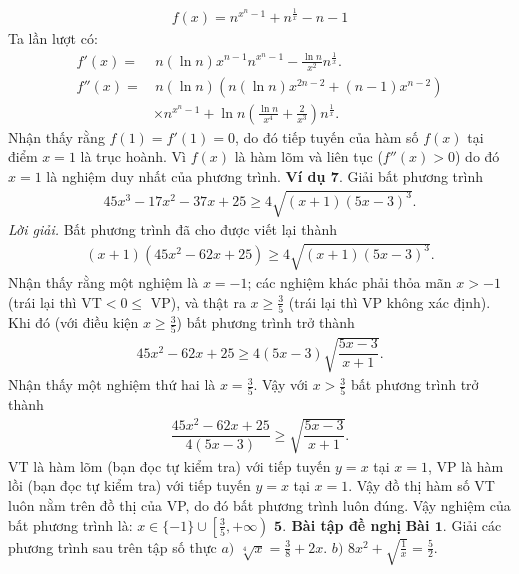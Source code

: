 \begin{multicols}{2}
	\begin{align*}
		f(x)=n^{x^n-1}+n^{\frac 1x}-n-1
	\end{align*}
	Ta lần lượt có:
	\begin{align*}
		f'(x)=&\,n(\ln n)x^{n-1}n^{x^n-1}-\frac {\ln n}{x^2}n^{\frac 1x}.\\
		f''(x)=&\,n(\ln n)\left(n(\ln n)x^{2n-2}+(n-1)x^{n-2}\right)\\
		&\times n^{x^n-1}+\ln n\left(\frac {\ln n}{x^4}+\frac 2{x^3}\right)n^{\frac 1x}.
	\end{align*}
	Nhận thấy rằng $f(1)=f'(1)=0$, do đó tiếp tuyến của hàm số $f(x)$ tại điểm $x=1$ là trục hoành.
	\vskip 0.1cm 
	Vì $f(x)$ là hàm lõm và liên tục ($f''(x)>0$) do đó $x=1$ là nghiệm duy nhất của phương trình. 
	\vskip 0.1cm
	\textbf{\color{hoccungpi}Ví dụ $\pmb{7.}$} Giải bất phương trình
	\begin{align*}
		45x^3\!-\!17x^2\!-\!37x\!+\!25\!\ge\! 4\sqrt{\!\!(x\!+\!1)(5x\!-\!3)^3}.
	\end{align*}
	\textit{Lời giải.} Bất phương trình đã cho được viết lại thành 
	\begin{align*}
		(x\!+\!1\!)(45x^2\!-\!62x\!+\!25)\!\ge\! 4\sqrt{\!\!(x\!+\!1\!)(5x\!-\!3)^3}.
	\end{align*}
	Nhận thấy rằng một nghiệm là $x=-1$; các nghiệm khác phải thỏa mãn $x>-1$ (trái lại thì VT$<0\le$ VP), và thật ra $x\ge\frac 35$ (trái lại thì VP không xác định).
	\vskip 0.1cm
	Khi đó (với điều kiện $x\ge\frac 35$) bất phương trình trở thành
	\begin{align*}
		45x^2-62x+25\ge 4(5x-3)\sqrt{\dfrac{5x-3}{x+1}}.
	\end{align*}
	Nhận thấy một nghiệm thứ hai là $x=\frac 35$. Vậy với $x>\frac 35$ bất phương trình trở thành
	\begin{align*}
		\dfrac{45x^2-62x+25}{4(5x-3)}\ge \sqrt{\dfrac{5x-3}{x+1}}.
	\end{align*}
	VT là hàm lõm (bạn đọc tự kiểm tra) với tiếp tuyến $y=x$ tại $x=1$, VP là hàm lồi (bạn đọc tự kiểm tra) với tiếp tuyến $y=x$ tại $x=1$. Vậy đồ thị hàm số VT luôn nằm trên đồ thị của VP,  do đó bất phương trình luôn đúng.
	\vskip 0.1cm
	Vậy nghiệm của bất phương trình là: \linebreak $x\in\{-1\}\cup\left[\frac 35,+\infty\right)$
	\vskip 0.1cm
	\textbf{\color{hoccungpi}$\pmb{5.}$ Bài tập đề nghị}
	\vskip 0.1cm
	\textbf{\color{hoccungpi}Bài $\pmb{1.}$} Giải các phương trình sau trên tập số thực
	\vskip 0.1cm
	$a)$  $\sqrt[4]{x}=\frac{3}{8}+2x$.
	\vskip 0.1cm
	$b)$ $8x^2+\sqrt{\frac{1}{x}}=\frac{5}{2}.$

\end{multicols}

